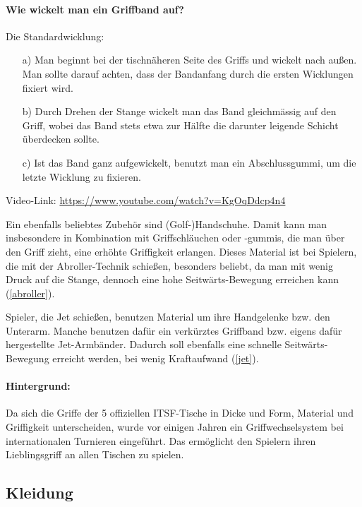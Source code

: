\paragraph{Wie wickelt man ein Griffband auf?} Die Standardwicklung: 
\begin{itemize}
\item[a)] Man beginnt bei der tischnäheren Seite des Griffs und wickelt nach außen.
Man sollte darauf achten, dass der Bandanfang durch die ersten Wicklungen fixiert wird. 
\item[b)] Durch Drehen der Stange wickelt man das Band gleichmässig auf den Griff, wobei das Band stets etwa zur Hälfte die darunter leigende Schicht überdecken sollte.
\item[c)] Ist das Band ganz aufgewickelt, benutzt man ein Abschlussgummi, um die letzte Wicklung zu fixieren.
\end{itemize}
Video-Link: \url{https://www.youtube.com/watch?v=KgOqDdcp4n4}


Ein ebenfalls beliebtes Zubehör sind (Golf-)Handschuhe. 
Damit kann man insbesondere in Kombination mit Griffschläuchen oder -gummis, die man über den Griff zieht, eine erhöhte Griffigkeit erlangen.
Dieses Material ist bei Spielern, die mit der Abroller-Technik schießen, besonders beliebt, da man mit wenig Druck auf die Stange, dennoch eine hohe Seitwärts-Bewegung erreichen kann (\ref{abroller}).  

Spieler, die Jet schießen, benutzen Material um ihre Handgelenke bzw. den Unterarm. 
Manche benutzen dafür ein verkürztes Griffband bzw. eigens dafür hergestellte Jet-Armbänder.
Dadurch soll ebenfalls eine schnelle Seitwärts-Bewegung erreicht werden, bei wenig Kraftaufwand (\ref{jet}).



\paragraph{Hintergrund:} Da sich die Griffe der 5 offiziellen ITSF-Tische in Dicke und Form, Material und Griffigkeit unterscheiden, wurde vor einigen Jahren ein Griffwechselsystem bei internationalen Turnieren eingeführt.
Das ermöglicht den Spielern ihren Lieblingsgriff an allen Tischen zu spielen. 

\subsection{Kleidung}
\label{tisch:zubehoer:kleidung}

